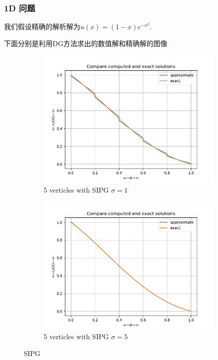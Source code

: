 \subsubsection*{1D 问题}
我们假设精确的解析解为$u(x) = (1-x)e^{-x^2}$. 

下面分别是利用DG方法求出的数值解和精确解的图像
\begin{figure}[H]
    \centering  
    \begin{subfigure}{0.5\textwidth}  
        \centering  
        \includegraphics[width=0.9\linewidth]{./pics/final/possion/1d/n5ss-1p1.png}  
        \caption{5 verticles with SIPG $\sigma=1$}  
    \end{subfigure}%
    \begin{subfigure}{0.5\textwidth}  
        \centering  
        \includegraphics[width=0.9\linewidth]{./pics/final/possion/1d/n5ss-1p5.png}  
        \caption{5 verticles with SIPG $\sigma=5$}
    \end{subfigure}  
    \caption{SIPG}  
\end{figure} 

